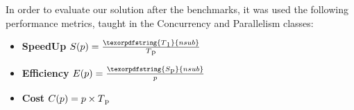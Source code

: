 \par In order to evaluate our solution after the benchmarks, it was used the following performance metrics, taught in the Concurrency and Parallelism classes:
\begin{itemize}
    \item \textbf{SpeedUp}
            \(S(p) = \frac{\texorpdfstring{T\textsubscript{1}}{nsub}}{T\textsubscript{p}}\)\\
    \item \textbf{Efficiency}
            \(E(p) = \frac{\texorpdfstring{S\textsubscript{p}}{nsub}}{p}\)\\
    \item \textbf{Cost}
            \(C(p) = p \times T\textsubscript{p}\)\\
\end{itemize}


